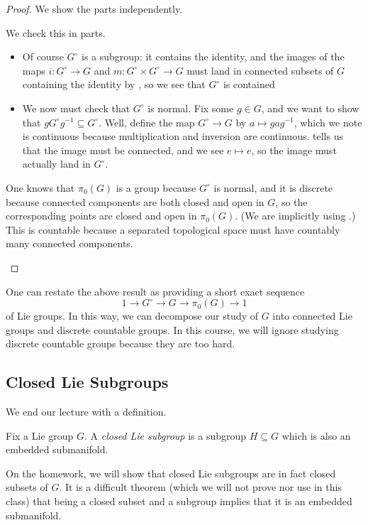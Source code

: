 \documentclass[../notes.tex]{subfiles}
\begin{document}
\begin{proof}
	We show the parts independently.
	\begin{listalph}
		\item We check this in parts.
		\begin{itemize}
			\item Of course $G^\circ$ is a subgroup: it contains the identity, and the images of the maps $i\colon G^\circ\to G$ and $m\colon G^\circ\times G^\circ\to G$ must land in connected subsets of $G$ containing the identity by , so we see that $G^\circ$ is contained 
			\item We now must check that $G^\circ$ is normal. Fix some $g\in G$, and we want to show that $gG^\circ g^{-1}\subseteq G^\circ$. Well, define the map $G^\circ\to G$ by $a\mapsto gag^{-1}$, which we note is continuous because multiplication and inversion are continuous.  tells us that the image must be connected, and we see $e\mapsto e$, so the image must actually land in $G^\circ$.
		\end{itemize}
		\item One knows that $\pi_0(G)$ is a group because $G^\circ$ is normal, and it is discrete because connected components are both closed and open in $G$, so the corresponding points are closed and open in $\pi_0(G)$. (We are implicitly using .) This is countable because a separated topological space must have countably many connected components.
		\qedhere
	\end{listalph}
\end{proof}
\begin{remark}
	One can restate the above result as providing a short exact sequence
	\[1\to G^\circ\to G\to\pi_0(G)\to1\]
	of Lie groups. In this way, we can decompose our study of $G$ into connected Lie groups and discrete countable groups. In this course, we will ignore studying discrete countable groups because they are too hard.
\end{remark}

\subsection{Closed Lie Subgroups}
We end our lecture with a definition.
\begin{definition}
	Fix a Lie group $G$. A \textit{closed Lie subgroup} is a subgroup $H\subseteq G$ which is also an embedded submanifold.
\end{definition}
\begin{remark}
	On the homework, we will show that closed Lie subgroups are in fact closed subsets of $G$. It is a difficult theorem (which we will not prove nor use in this class) that being a closed subset and a subgroup implies that it is an embedded submanifold.
\end{remark}
\end{document}
